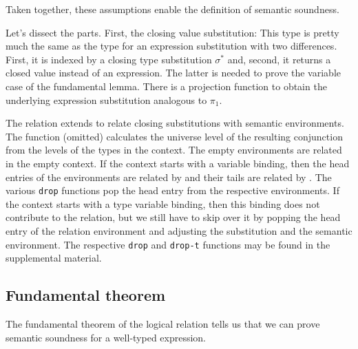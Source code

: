 \documentclass[acmsmall,anonymous,review,screen]{acmart}
\begin{document}
Taken together, these assumptions enable the definition of semantic soundness.
\FundamentalSemanticSoundness

Let's dissect the parts. First, the closing value substitution:
\LogicalCSub
This type is pretty much the same as the type for an expression
substitution with two differences. First, it is indexed by a closing
type substitution $\sigma^*$ and, second, it returns a closed value instead of an
expression. The latter is needed to prove the variable case of the
fundamental lemma. There is a projection function to obtain the
underlying expression substitution analogous to $\pi_1$.
\LogicalESSC

The relation {\AGSem} extends {\AVSem} to relate closing substitutions
with semantic environments. The {\AlevelEnv} function (omitted) calculates the universe level
of the resulting conjunction from the levels of the types in the
context.
\LogicalMCG
The empty environments are related in the empty context.
If the context starts with a variable binding, then the head entries of
the environments are related by {\AVSem} and their tails are
related by {\AGSem}.
The various \texttt{drop} functions pop the head entry from the
respective environments.
If the context starts with a type variable binding, then this binding
does not contribute to the relation, but we still have to skip over it
by popping the head entry of the relation environment and adjusting the
substitution and the semantic environment.
The respective \texttt{drop} and \texttt{drop-t} functions may be
found in the supplemental material.

\subsection{Fundamental theorem}
\label{sec:fundamental}

The fundamental theorem of the logical relation tells us that we can
prove semantic soundness for a well-typed expression.
\FundamentalFundamentalType
\end{document}
